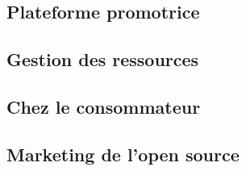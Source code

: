 \chapter{\color{burntorange}{Etude terrain}} %
	\section{Plateforme promotrice}
	\section{Gestion des ressources}
	\section{Chez le consommateur}
	\section{Marketing de l'open source}